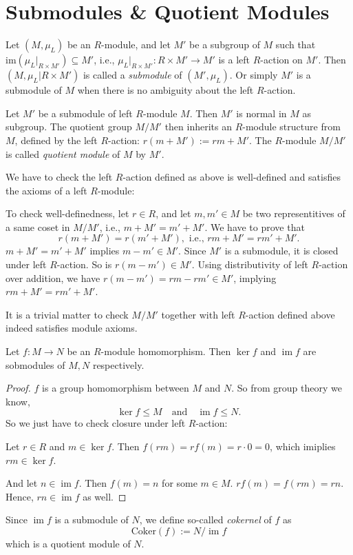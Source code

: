 \section{Submodules \& Quotient Modules}
\begin{definition}[Submodule]
    Let \((M, \mu_L)\) be an  \(R\)-module, and let \(M'\) be a subgroup of  \(M\) such that  \(\text{im}(\mu_L|_{R \times M'}) \subseteq M'\), i.e., \(\mu_L|_{R \times M'}: R \times M' \longrightarrow M'\) is a left  \(R\)-action on  \(M'\). Then  \((M, \mu_L|{R \times M'})\) is called a  \emph{submodule} of \((M', \mu_L)\). Or simply \(M'\) is a submodule of  \(M\) when there is no ambiguity about the left \(R\)-action.
\end{definition}
\begin{definition}
    Let \(M'\) be a submodule of left \(R\)-module \(M\). Then  \(M'\) is normal in  \(M\) as subgroup. The quotient group \(M/M'\) then inherits an \(R\)-module structure from  \(M\), defined by the left  \(R\)-action: \(r(m + M') := rm + M'\). The \(R\)-module  \(M/M'\) is called \emph{quotient module} of  \(M\) by  \(M'\).
\end{definition}
We have to check the left \(R\)-action defined as above is well-defined and satisfies the axioms of a left  \(R\)-module:

To check well-definedness, let \(r \in R\), and let \(m, m' \in M\) be two representitives of a same coset in \(M/M'\), i.e., \(m + M' = m' + M'\). We have to prove that 
\[
    r(m + M') = r(m' + M'), \text{ i.e., }rm + M' = rm' + M'.
\] 
 \(m + M' = m' + M'\) implies \(m - m' \in M'\). Since \(M'\) is a submodule, it is closed under left \(R\)-action. So is \(r(m - m') \in M'\). Using distributivity of left \(R\)-action over addition, we have  \(r(m - m') = rm - rm' \in M'\), implying \(rm + M' = rm' + M'\).

 It is a trivial matter to check \(M/M'\) together with left \(R\)-action defined above indeed satisfies module axioms.
 \begin{proposition}
     Let \(f: M \longrightarrow N\) be an  \(R\)-module homomorphism. Then  \(\ker f\) and  \(\operatorname{im} f\) are sobmodules of  \(M, N\) respectively.
\end{proposition}
\begin{proof}
    \(f\) is a group homomorphism between  \(M\) and  \(N\). So from group theory we know, 
    \[
        \ker f \le M \quad \text{and} \quad \operatorname{im} f \le N.
    \] 
    So we just have to check closure under left  \(R\)-action:

    Let  \(r \in R\) and  \(m \in \ker f\). Then  \(f(rm) = rf(m) = r \cdot 0 = 0\), which imiplies \(rm \in \ker f\).

    And let \(n \in \operatorname{im} f\). Then  \(f(m) = n\) for some \(m \in M\).  \(rf(m) = f(rm) = rn\). Hence,  \(rn \in \operatorname{im} f\) as well.
\end{proof}
Since \(\operatorname{im} f\) is a submodule of  \(N\), we define so-called \emph{cokernel} of \(f\) as
 \[
     \text{Coker}(f) := N/\operatorname{im} f
\] which is a quotient module of \(N\).

